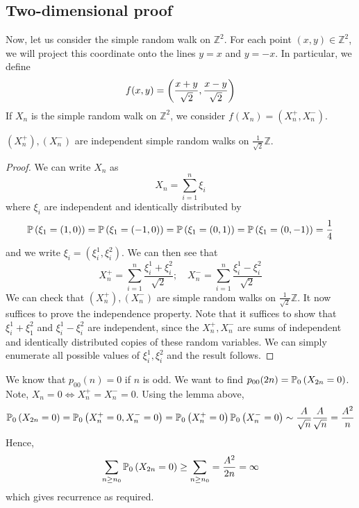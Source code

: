 \subsection{Two-dimensional proof}
Now, let us consider the simple random walk on \( \mathbb Z^2 \).
For each point \( (x,y) \in \mathbb Z^2 \), we will project this coordinate onto the lines \( y=x \) and \( y=-x \).
In particular, we define
\[
	f(x,y) = \qty(\frac{x+y}{\sqrt{2}}, \frac{x-y}{\sqrt{2}})
\]
If \( X_n \) is the simple random walk on \( \mathbb Z^2 \), we consider \( f(X_n) = (X_n^+, X_n^-) \).
\begin{lemma}
	\( (X_n^+), (X_n^-) \) are independent simple random walks on \( \frac{1}{\sqrt{2}} \mathbb Z \).
\end{lemma}
\begin{proof}
	We can write \( X_n \) as
	\[
		X_n = \sum_{i=1}^n \xi_i
	\]
	where \( \xi_i \) are independent and identically distributed by
	\[
		\mathbb{P}\left({\xi_1 = (1,0)}\right) = \mathbb{P}\left({\xi_1 = (-1,0)}\right) = \mathbb{P}\left({\xi_1 = (0,1)}\right) = \mathbb{P}\left({\xi_1 = (0,-1)}\right) = \frac{1}{4}
	\]
	and we write \( \xi_i = (\xi_i^1, \xi_i^2) \).
	We can then see that
	\[
		X_n^+ = \sum_{i=1}^n \frac{\xi_i^1 + \xi_i^2}{\sqrt{2}};\quad X_n^- = \sum_{i=1}^n \frac{\xi_i^1 - \xi_i^2}{\sqrt{2}}
	\]
	We can check that \( (X_n^+), (X_n^-) \) are simple random walks on \( \frac{1}{\sqrt{2}} \mathbb Z \).
	It now suffices to prove the independence property.
	Note that it suffices to show that \( \xi_i^1 + \xi_1^2 \) and \( \xi_i^1 - \xi_i^2 \) are independent, since the \( X_n^+, X_n^- \) are sums of independent and identically distributed copies of these random variables.
	We can simply enumerate all possible values of \( \xi_i^1, \xi_i^2 \) and the result follows.
\end{proof}
We know that \( p_{00}(n) = 0 \) if \( n \) is odd.
We want to find \( p_{00}(2n) = \mathbb{P}_{0}\left({X_{2n} = 0}\right) \).
Note, \( X_n = 0 \iff X_n^+ = X_n^- = 0 \).
Using the lemma above,
\[
	\mathbb{P}_{0}\left({X_{2n} = 0}\right) = \mathbb{P}_{0}\left({X_n^+ = 0, X_n^- = 0}\right) = \mathbb{P}_{0}\left({X_n^+ = 0}\right) \mathbb{P}_{0}\left({X_n^- = 0}\right) \sim \frac{A}{\sqrt{n}} \frac{A}{\sqrt{n}} = \frac{A^2}{n}
\]
Hence,
\[
	\sum_{n \geq n_0} \mathbb{P}_{0}\left({X_{2n} = 0}\right) \geq \sum_{n \geq n_0} = \frac{A^2}{2n} = \infty
\]
which gives recurrence as required.

